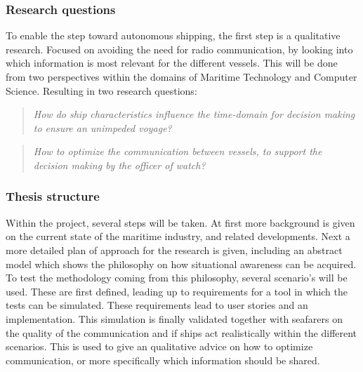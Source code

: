 \subsubsection*{Research questions}
To enable the step toward autonomous shipping, the first step is a qualitative research. Focused on avoiding the need for radio communication, by looking into which information is most relevant for the different vessels. This will be done from two perspectives within the domains of Maritime Technology and Computer Science. Resulting in two research questions:

\begin{quotation}
	\emph{How do ship characteristics influence the time-domain for decision making to ensure an unimpeded voyage?} 
\end{quotation}

\begin{quotation}
	\emph{How to optimize the communication between vessels, to support the decision making by the officer of watch?}
\end{quotation}


\subsubsection*{Thesis structure}
Within the project, several steps will be taken. At first more background is given on the current state of the maritime industry, and related developments. 
Next a more detailed plan of approach for the research is given, including an abstract model which shows the philosophy on how situational awareness can be acquired. 
To test the methodology coming from this philosophy, several scenario's will be used. These are first defined, leading up to requirements for a tool in which the tests can be simulated.
These requirements lead to user stories and an implementation.
This simulation is finally validated together with seafarers on the quality of the communication and if ships act realistically within the different scenarios. This is used to give an qualitative advice on how to optimize communication, or more specifically which information should be shared.
